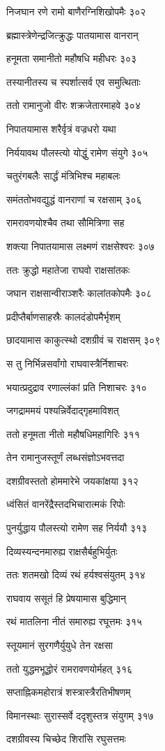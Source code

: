 निजघान रणे रामो बाणैरग्निशिखोपमैः ३०२

ब्रह्मास्त्रेणेन्द्रजित्क्रुद्धः पातयामास वानरान्

हनूमता समानीतो महौषधि महीधरः ३०३

तस्यानीतस्य च स्पर्शात्सर्व एव समुत्थिताः

ततो रामानुजो वीरः शक्रजेतारमाहवे ३०४

निपातयामास शरैर्वृत्रं वज्रधरो यथा

निर्ययावथ पौलस्त्यो योद्धुं रामेण संयुगे ३०५

चतुरंगबलैः सार्द्धं मंत्रिभिश्च महाबलः

समंततोभवद्युद्धं वानराणां च रक्षसाम् ३०६

रामरावणयोश्चैव तथा सौमित्रिणा सह

शक्त्या निपातयामास लक्ष्मणं राक्षसेश्वरः ३०७

ततः क्रुद्धो महातेजा राघवो राक्षसांतकः

जघान राक्षसान्वीराञ्शरैः कालांतकोपमैः ३०८

प्रदीप्तैर्बाणसाहस्रैः कालदंडोपमैर्भृशम्

छादयामास काकुत्स्थो दशग्रीवं च राक्षसम् ३०९

स तु निर्भिन्नसर्वांगो राघवास्त्रैर्निशाचरः

भयात्प्रदुद्राव रणाल्लंकां प्रति निशाचरः ३१०

जगद्राममयं पश्यन्निर्वेदाद्गृहमाविशत्

ततो हनूमता नीतो महौषधिमहागिरिः ३११

तेन रामानुजस्तूर्णं लब्धसंज्ञोऽभवत्तदा

दशग्रीवस्ततो होममारेभे जयकांक्षया ३१२

ध्वंसितं वानरेंद्रैस्तदभिचारात्मकं रिपोः

पुनर्युद्धाय पौलस्त्यो रामेण सह निर्ययौ ३१३

दिव्यस्यन्दनमारुह्य राक्षसैर्बहुभिर्युतः

ततः शतमखो दिव्यं रथं हर्यश्वसंयुतम् ३१४

राघवाय ससूतं हि प्रेषयामास बुद्धिमान्

रथं मातलिना नीतं समारुह्य रघूत्तमः ३१५

स्तूयमानं सुरगणैर्युयुधे तेन रक्षसा

ततो युद्धमभूद्धोरं रामरावणयोर्महत् ३१६

सप्ताह्निकमहोरात्रं शस्त्रास्त्रैरतिभीषणम्

विमानस्थाः सुरास्सर्वे ददृशुस्तत्र संयुगम् ३१७

दशग्रीवस्य चिच्छेद शिरांसि रघुसत्तमः

